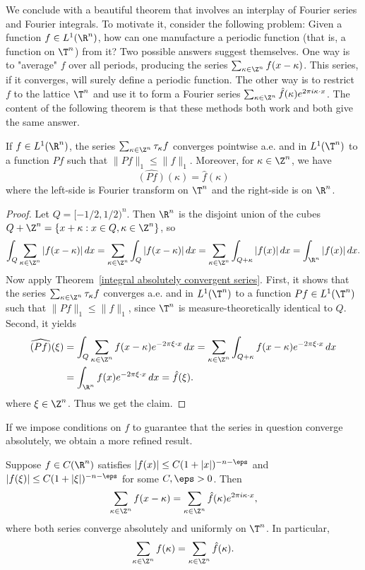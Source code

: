 We conclude with a beautiful theorem that involves an interplay of Fourier series and Fourier integrals. To motivate it, consider the following problem: Given a function $f\in L^1(\R^n)$, how can one manufacture a periodic function (that is, a function on $\T^n$) from it? Two possible answers suggest themselves. One way is to "average" $f$ over all periods, producing the series $\sum_{\kappa\in\Z^n}f(x-\kappa)$. This series, if it converges, will surely define a periodic function. The other way is to restrict $f$ to the lattice $\T^n$ and use it to form a Fourier series $\sum_{\kappa\in\Z^n}\hat{f}(\kappa)e^{2\pi i\kappa\cdot x}$. The content of the following theorem is that these methods both work and both give the same answer.
\begin{theorem}\label{Fourier transform and fourier integral coefficient}
If $f\in L^1(\R^n)$, the series $\sum_{\kappa\in\Z^n}\tau_\kappa f$ converges pointwise a.e. and in $L^1(\T^n)$ to a function $Pf$ such that $\|Pf\|_1\leq\|f\|_1$. Moreover, for $\kappa\in\Z^n$, we have
\[\widehat{(Pf)}(\kappa)=\hat{f}(\kappa)\]
where the left-side is Fourier transform on $\T^n$ and the right-side is on $\R^n$.
\end{theorem}
\begin{proof}
Let $Q=[-1/2,1/2)^n$. Then $\R^n$ is the disjoint union of the cubes $Q+\Z^n=\{x+\kappa:x\in Q,\kappa\in\Z^n\}$, so
\[\int_Q\sum_{\kappa\in\Z^n}|f(x-\kappa)|\,dx=\sum_{\kappa\in\Z^n}\int_Q|f(x-\kappa)|\,dx=\sum_{\kappa\in\Z^n}\int_{Q+\kappa}|f(x)|\,dx=\int_{\R^n}|f(x)|\,dx.\]
Now apply Theorem~\ref{integral absolutely convergent series}. First, it shows that the series $\sum_{\kappa\in\Z^n}\tau_\kappa f$ converges a.e. and in $L^1(\T^n)$ to a function $Pf\in L^1(\T^n)$ such that $\|Pf\|_1\leq\|f\|_1$, since $\T^n$ is measure-theoretically identical to $Q$. Second, it yields
\begin{align*}
\widehat{(Pf)}(\xi)&=\int_Q\sum_{\kappa\in\Z^n}f(x-\kappa)e^{-2\pi\xi\cdot x}\,dx=\sum_{\kappa\in\Z^n}\int_{Q+\kappa}f(x-\kappa)e^{-2\pi\xi\cdot x}\,dx\\
&=\int_{\R^n}f(x)e^{-2\pi\xi\cdot x}\,dx=\hat{f}(\xi).
\end{align*}
where $\xi\in\Z^n$. Thus we get the claim.
\end{proof}
If we impose conditions on $f$ to guarantee that the series in question converge absolutely, we obtain a more refined result.
\begin{theorem}
Suppose $f\in C(\R^n)$ satisfies $|f(x)|\leq C(1+|x|)^{-n-\eps}$ and $|f(\xi)|\leq C(1+|\xi|)^{-n-\eps}$ for some $C,\eps>0$. Then
\[\sum_{\kappa\in\Z^n}f(x-\kappa)=\sum_{\kappa\in\Z^n}\hat{f}(\kappa)e^{2\pi i\kappa\cdot x},\]
where both series converge absolutely and uniformly on $\T^n$. In particular,
\[\sum_{\kappa\in\Z^n}f(\kappa)=\sum_{\kappa\in\Z^n}\hat{f}(\kappa).\]
\end{theorem}

